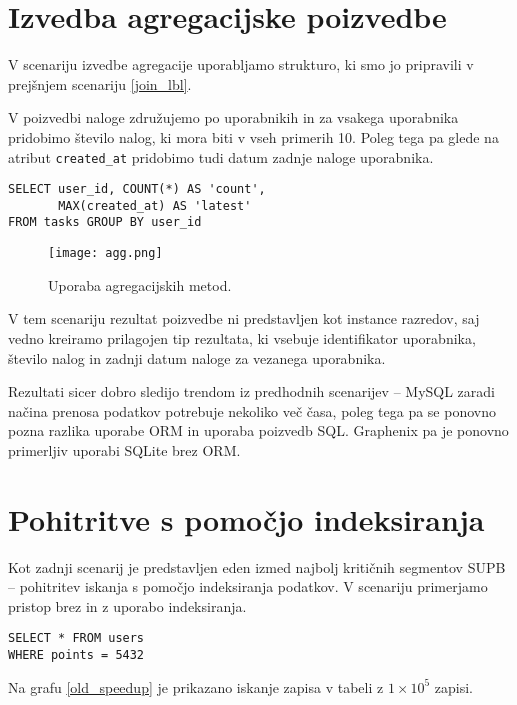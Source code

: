 \documentclass[a4paper,12pt,openright]{book}
\begin{document}
    \section{Izvedba agregacijske poizvedbe}

    V scenariju izvedbe agregacije uporabljamo strukturo, ki smo jo pripravili v prejšnjem scenariju \ref{join_lbl}.

    V poizvedbi naloge združujemo po uporabnikih in za vsakega uporabnika pridobimo število nalog, ki mora biti v vseh primerih 10. Poleg tega pa glede na atribut {\tt created\_at} pridobimo tudi datum zadnje naloge uporabnika.
    
\begin{verbatim}
SELECT user_id, COUNT(*) AS 'count', 
       MAX(created_at) AS 'latest' 
FROM tasks GROUP BY user_id
\end{verbatim}

    \begin{figure}[H]
        \centerline{\texttt{[image: agg.png]}}
        \caption{Uporaba agregacijskih metod.}
        \label{agg}
    \end{figure}

    \noindent
    V tem scenariju rezultat poizvedbe ni predstavljen kot instance razredov, saj vedno kreiramo prilagojen tip rezultata, ki vsebuje identifikator uporabnika, število nalog in zadnji datum naloge za vezanega uporabnika.

    Rezultati sicer dobro sledijo trendom iz predhodnih scenarijev – MySQL zaradi načina prenosa podatkov potrebuje nekoliko več časa, poleg tega pa se ponovno pozna razlika uporabe ORM in uporaba poizvedb SQL. Graphenix pa je ponovno primerljiv uporabi SQLite brez ORM.

    \section{Pohitritve s pomočjo indeksiranja}

    Kot zadnji scenarij je predstavljen eden izmed najbolj kritičnih segmentov SUPB – pohitritev iskanja s pomočjo indeksiranja podatkov. V scenariju primerjamo pristop brez in z uporabo indeksiranja.
    
\begin{verbatim}
SELECT * FROM users
WHERE points = 5432
\end{verbatim}

    \noindent
    Na grafu \ref{old_speedup} je prikazano iskanje zapisa v tabeli z $ 1 \times 10^5$ zapisi.
\end{document}
